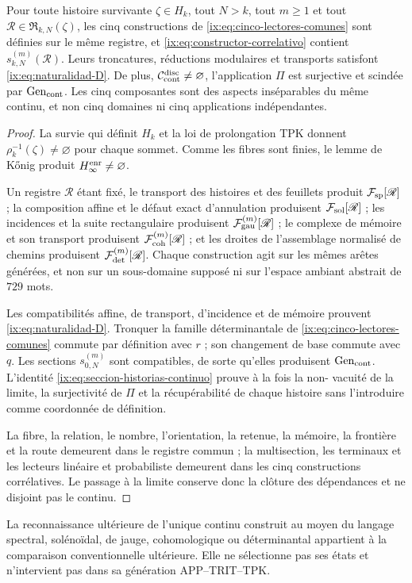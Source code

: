 \begin{theorem}
\label{ix:thm:correlacion-cinco}
Pour toute histoire survivante \(\zeta\in H_k\), tout \(N>k\), tout
\(m\geq1\) et tout \(\mathscr R\in\mathfrak R_{k,N}(\zeta)\), les cinq
constructions de \eqref{ix:eq:cinco-lectores-comunes} sont définies sur le
même registre, et \eqref{ix:eq:constructor-correlativo} contient
\(s_{k,N}^{(m)}(\mathscr R)\). Leurs troncatures, réductions modulaires et
transports satisfont \eqref{ix:eq:naturalidad-D}. De plus,
\(\mathcal C_{\rm cont}^{\rm disc}\neq\varnothing\), l'application \(\Pi\)
est surjective et scindée par \(\operatorname{Gen}_{\rm cont}\). Les
cinq composantes sont des aspects inséparables du même continu, et non cinq
domaines ni cinq applications indépendantes.
\end{theorem}

\begin{proof}
La survie qui définit \(H_k\) et la loi de prolongation TPK donnent
\(\rho_k^{-1}(\zeta)\neq\varnothing\) pour chaque sommet. Comme les fibres sont
finies, le lemme de Kőnig produit \(H_\infty^{\rm enr}\neq\varnothing\).

Un registre \(\mathscr R\) étant fixé, le transport des histoires et des feuillets produit \(\mathcal F_{\rm sp}[\mathscr R]\) ; la composition affine et le défaut exact d'annulation produisent \(\mathcal F_{\rm sol}[\mathscr R]\) ; les incidences et la suite rectangulaire produisent \(\mathcal F_{\rm gau}^{(m)}[\mathscr R]\) ; le complexe de mémoire et son transport produisent \(\mathcal F_{\rm coh}^{(m)}[\mathscr R]\) ; et les droites de l'assemblage normalisé de chemins produisent \(\mathcal F_{\rm det}^{(m)}[\mathscr R]\). Chaque construction agit sur les mêmes arêtes générées, et non sur un sous-domaine supposé ni sur l'espace ambiant abstrait de \(729\) mots.

Les compatibilités affine, de transport, d'incidence et de mémoire prouvent
\eqref{ix:eq:naturalidad-D}. Tronquer la famille déterminantale de
\eqref{ix:eq:cinco-lectores-comunes} commute par
définition avec \(r\) ; son changement de base commute avec \(q\). Les sections
\(s_{0,N}^{(m)}\) sont compatibles, de sorte qu'elles produisent
\(\operatorname{Gen}_{\rm cont}\). L'identité
\eqref{ix:eq:seccion-historias-continuo} prouve à la fois la non-
vacuité de la limite, la surjectivité de \(\Pi\) et la récupérabilité de chaque
histoire sans l'introduire comme coordonnée de définition.

La fibre, la relation, le nombre, l'orientation, la retenue, la mémoire, la
frontière et la route demeurent dans le registre commun ; la multisection, les
terminaux et les lecteurs linéaire et probabiliste demeurent dans les cinq
constructions corrélatives. Le passage à la limite conserve donc la clôture des
dépendances et ne disjoint pas le continu.
\end{proof}

La reconnaissance ultérieure de l'unique continu construit au moyen du langage spectral, solénoïdal, de jauge, cohomologique ou déterminantal appartient à la comparaison conventionnelle ultérieure. Elle ne sélectionne pas ses états et n'intervient pas dans sa génération APP--TRIT--TPK.
